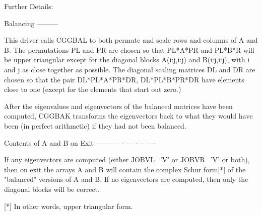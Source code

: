 \begin{DoxyParagraph}{Further Details\+: }
\begin{DoxyVerb}  Balancing
  ---------

  This driver calls CGGBAL to both permute and scale rows and columns
  of A and B.  The permutations PL and PR are chosen so that PL*A*PR
  and PL*B*R will be upper triangular except for the diagonal blocks
  A(i:j,i:j) and B(i:j,i:j), with i and j as close together as
  possible.  The diagonal scaling matrices DL and DR are chosen so
  that the pair  DL*PL*A*PR*DR, DL*PL*B*PR*DR have elements close to
  one (except for the elements that start out zero.)

  After the eigenvalues and eigenvectors of the balanced matrices
  have been computed, CGGBAK transforms the eigenvectors back to what
  they would have been (in perfect arithmetic) if they had not been
  balanced.

  Contents of A and B on Exit
  -------- -- - --- - -- ----

  If any eigenvectors are computed (either JOBVL='V' or JOBVR='V' or
  both), then on exit the arrays A and B will contain the complex Schur
  form[*] of the "balanced" versions of A and B.  If no eigenvectors
  are computed, then only the diagonal blocks will be correct.

  [*] In other words, upper triangular form.\end{DoxyVerb}
 
\end{DoxyParagraph}
\hypertarget{group__complexGEeigen_gaead5d7a4df1e51d7f25d9540acc596e8}{}
